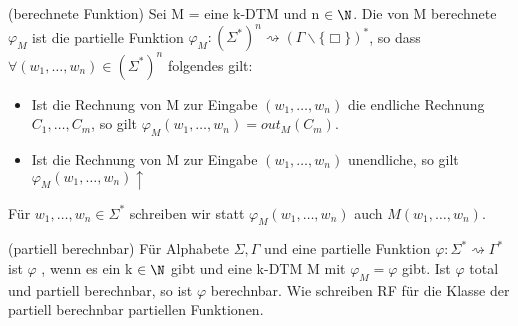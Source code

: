 \documentclass[a4paper]{article}
\begin{document}
 \begin{DefBox}{(berechnete Funktion)}
  Sei M = \TM eine k-DTM und n $\in \N$. Die von M berechnete  $\varphi_M$ ist die partielle Funktion $\varphi_M : (\Sigma^*)^n \rightsquigarrow (\Gamma \backslash \lbrace \Box \rbrace)^*$, so dass $\forall (w_1,\dots,w_n) \in (\Sigma^*)^n$ folgendes gilt:
  \begin{itemize}
   \item Ist die Rechnung von M zur Eingabe $(w_1,\dots,w_n)$ die endliche Rechnung $C_1,\dots,C_m$, so gilt $\varphi_M (w_1,\dots,w_n) = out_M(C_m).$
   \item Ist die Rechnung von M zur Eingabe $(w_1,\dots,w_n)$ unendliche, so gilt $\varphi_M (w_1,\dots,w_n) \uparrow$
  \end{itemize}
Für $w_1,\dots,w_n \in \Sigma^*$ schreiben wir statt $\varphi_M(w_1,\dots,w_n)$ auch $M (w_1,\dots,w_n)$.
 \end{DefBox}

 \begin{DefBox}{(partiell berechnbar)}
  Für Alphabete $\Sigma, \Gamma$ und eine partielle Funktion $\varphi: \Sigma^* \rightsquigarrow \Gamma^*$ ist $\varphi$ , wenn es ein k $\in \N$ gibt und eine k-DTM M mit $\varphi_M = \varphi$ gibt. Ist $\varphi$ total und partiell berechnbar, so ist $\varphi$ berechnbar. Wie schreiben RF für die Klasse der partiell berechnbar partiellen Funktionen.
 \end{DefBox}
\end{document}
